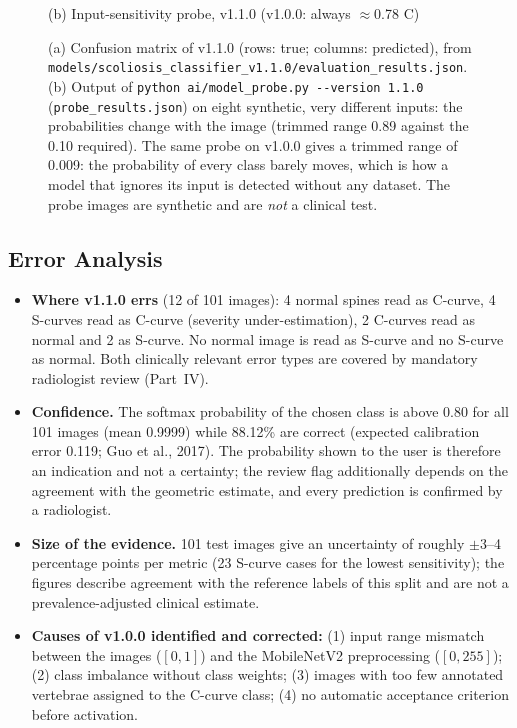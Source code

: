 \documentclass[12pt,a4paper]{article}
\newcommand{\fp}[1]{\nolinkurl{#1}}
\begin{document}
\begin{figure}[H]
\begin{minipage}{0.5\textwidth}
{\footnotesize (b) Input-sensitivity probe, v1.1.0 (v1.0.0: always $\approx$0.78 C)}
\end{minipage}
\caption{(a) Confusion matrix of v1.1.0 (rows: true; columns: predicted), from \fp{models/scoliosis_classifier_v1.1.0/evaluation_results.json}. (b) Output of \texttt{python ai/model\_probe.py -{}-version 1.1.0}
(\fp{probe_results.json}) on eight synthetic, very different inputs: the probabilities change with the image (trimmed range 0.89 against the 0.10 required). The same probe on v1.0.0 gives
a trimmed range of 0.009: the probability of every class barely moves, which is how a model that ignores its input is detected without any dataset. The probe images are synthetic
and are \emph{not} a clinical test.}
\label{fig:confusion}
\end{figure}

\subsection{Error Analysis}

\begin{itemize}[leftmargin=*]
    \item \textbf{Where v1.1.0 errs} (12 of 101 images): 4 normal spines read as C-curve, 4 S-curves read as C-curve (severity under-estimation),
          2 C-curves read as normal and 2 as S-curve. No normal image is read as S-curve and no S-curve as normal. Both clinically relevant error types are
          covered by mandatory radiologist review (Part~IV).
    \item \textbf{Confidence.} The softmax probability of the chosen class is above 0.80 for all 101 images (mean 0.9999) while 88.12\% are correct
          (expected calibration error 0.119; Guo et al., 2017). The probability shown to the user is therefore an indication and not a certainty; the
          review flag additionally depends on the agreement with the geometric estimate, and every prediction is confirmed by a radiologist.
    \item \textbf{Size of the evidence.} 101 test images give an uncertainty of roughly $\pm$3--4 percentage points per metric (23 S-curve cases for the lowest sensitivity);
          the figures describe agreement with the reference labels of this split and are not a prevalence-adjusted clinical estimate.
    \item \textbf{Causes of v1.0.0 identified and corrected:} (1) input range mismatch between the images ($[0,1]$) and the MobileNetV2 preprocessing ($[0,255]$);
          (2) class imbalance without class weights; (3) images with too few annotated vertebrae assigned to the C-curve class; (4) no automatic acceptance criterion
          before activation.
\end{itemize}
\end{document}
